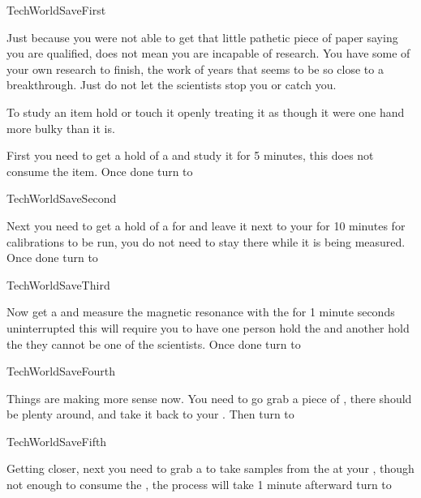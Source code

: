 \documentclass[greennotebook]{guildcamp3} %
\begin{document}
\startnotebook{\nTechWorldSave{}}

\begin{page}{TechWorldSaveFirst}
	
Just because you were not able to get that little pathetic piece of paper saying you are qualified, does not mean you are incapable of research. You have some of your own research to finish, the work of years that seems to be so close to a breakthrough. Just do not let the scientists stop you or catch you.  

To study an item hold or touch it openly treating it as though it were one hand more bulky than it is. 

First you need to get a hold of a \iCircuitBoard{} and study it for 5 minutes, this does not consume the item. Once done turn to 
	
\end{page}

\begin{page}{TechWorldSaveSecond}
	
Next you need to get a hold of a \iMagnet{} for and leave it next to your \sTechWorkbench{} for 10 minutes for calibrations to be run, you do not need to stay there while it is being measured. Once done turn to 

	
\end{page}

\begin{page}{TechWorldSaveThird}
	
Now get a \iLeadPipe{} and measure the magnetic resonance with the \iMagnet{} for 1 minute seconds uninterrupted this will require you to have one person hold the \iLeadPipe{} and another hold the \iMagnet{} they cannot be one of the scientists. Once done turn to 
	
\end{page}

\begin{page}{TechWorldSaveFourth}
	
	Things are making more sense now. You need to go grab a piece of \iScrapMetal{}, there should be plenty around, and take it back to your \sTechWorkbench{}. Then turn to 
	
\end{page}

\begin{page}{TechWorldSaveFifth}
	
	Getting closer, next you need to grab a \iMonoBlade{} to take samples from the \iScrapMetal{} at your \sTechWorkbench{}, though not enough to consume the \iScrapMetal{}, the process will take 1 minute  afterward turn to  
	
\end{page}
\end{document}
